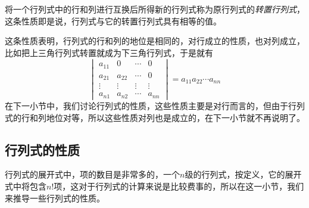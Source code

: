 将一个行列式中的行和列进行互换后所得新的行列式称为原行列式的\emph{转置行列式}，这条性质即是说，行列式与它的转置行列式具有相等的值。

这条性质表明，行列式的行和列的地位是相同的，对行成立的性质，也对列成立，比如把上三角行列式转置就成为下三角行列式，于是就有
  \[
  \begin{vmatrix}
    a_{11} & 0 & \cdots & 0 \\
    a_{21} & a_{22} & \cdots & 0 \\
    \vdots & \vdots & \vdots & \vdots \\
    a_{n1} & a_{n2} & \cdots & a_{nn}
  \end{vmatrix}
  = a_{11}a_{22}\cdots a_{nn}
  \]
  在下一小节中，我们讨论行列式的性质，这些性质主要是对行而言的，但由于行列式的行和列地位对等，所以这些性质对列也是成立的，在下一小节就不再说明了。

\subsection{行列式的性质}
\label{sec:properties-of-determinant}

行列式的展开式中，项的数目是非常多的，一个$n$级的行列式，按定义，它的展开式中将包含$n!$项，这对于行列式的计算来说是比较费事的，所以在这一小节，我们来推导一些行列式的性质。

